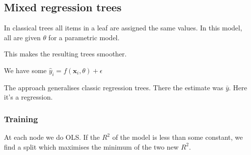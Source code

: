 
\subsection{Mixed regression trees}

In classical trees all items in a leaf are assigned the same values. In this model, all are given \(\theta \) for a parametric model.

This makes the resulting trees smoother.

We have some \(\hat y_i = f(\mathbf x_i, \theta ) + \epsilon \)

The approach generalises classic regression trees. There the estimate was \(\bar y\). Here it's a regression.

\subsubsection{Training}

At each node we do OLS. If the \(R^2\) of the model is less than some constant, we find a split which maximises the minimum of the two new \(R^2\).


